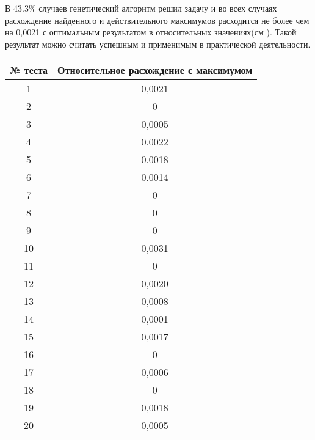 \FloatBarrier
В 43.3\% случаев генетический алгоритм решил задачу и во всех случаях расхождение найденного и действительного максимумов расходится не более чем на 0,0021 с оптимальным результатом в относительных значениях(см \cite{BigResults2}). Такой результат можно считать успешным и применимым в практической деятельности.

\begin{table}[ht!]
	\centering
	\begin{tabular}{|c|c|}
		\hline
		№ теста & Относительное расхождение с максимумом \\ \hline
		1       & 0,0021                                 \\ \hline
		2       & 0                                      \\ \hline
		3       & 0,0005                                 \\ \hline
		4       & 0.0022                                 \\ \hline
		5       & 0.0018                                 \\ \hline
		6       & 0.0014                                 \\ \hline
		7       & 0                                      \\ \hline
		8       & 0                                      \\ \hline
		9       & 0                                      \\ \hline
		10      & 0,0031                                 \\ \hline
		11      & 0                                      \\ \hline
		12      & 0,0020                                 \\ \hline
		13      & 0,0008                                 \\ \hline
		14      & 0,0001                                 \\ \hline
		15      & 0,0017                                 \\ \hline
		16      & 0                                      \\ \hline
		17      & 0,0006                                 \\ \hline
		18      & 0                                      \\ \hline
		19      & 0,0018                                 \\ \hline
		20      & 0,0005                                 \\ \hline

\end{tabular}
\end{table}
